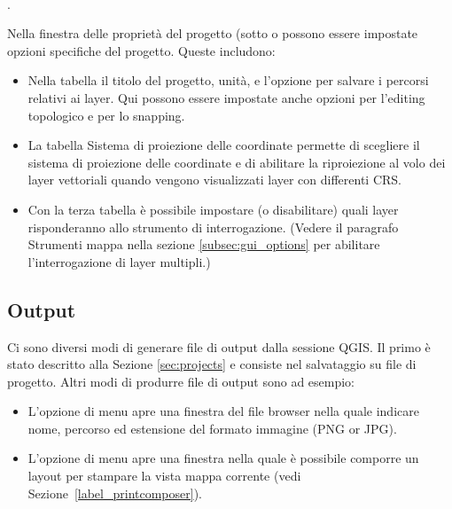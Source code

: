  \\
.

Nella finestra delle proprietà del progetto (sotto  o  possono essere impostate opzioni specifiche del progetto. Queste
includono:

\begin{itemize}
 \item Nella tabella  il titolo del progetto, unità, e l'opzione per salvare i percorsi relativi ai layer. Qui possono essere impostate anche opzioni per l'editing topologico e per lo snapping.
\item La tabella  Sistema di proiezione delle coordinate permette di scegliere il sistema di proiezione delle coordinate e di abilitare la riproiezione al volo dei layer vettoriali quando vengono visualizzati layer con differenti CRS.
\item Con la terza tabella  è possibile impostare (o disabilitare) quali layer risponderanno allo strumento di interrogazione. (Vedere il paragrafo Strumenti mappa nella sezione \ref{subsec:gui_options} per abilitare l'interrogazione di layer multipli.)
\end{itemize}

\subsection{Output}\label{sec:output}
Ci sono diversi modi di generare file di output dalla sessione QGIS.
Il primo è stato descritto alla Sezione \ref{sec:projects} e consiste nel
salvataggio su file di progetto. 
Altri modi di produrre file di output sono ad esempio:
\begin{itemize}
\item L'opzione di menu  apre una finestra del file browser nella quale indicare nome,
percorso ed estensione del formato immagine (PNG or JPG).
\item L'opzione di menu 
apre una finestra nella quale è possibile comporre un layout per stampare la
vista mappa corrente (vedi Sezione~\ref{label_printcomposer}).
\end{itemize}


